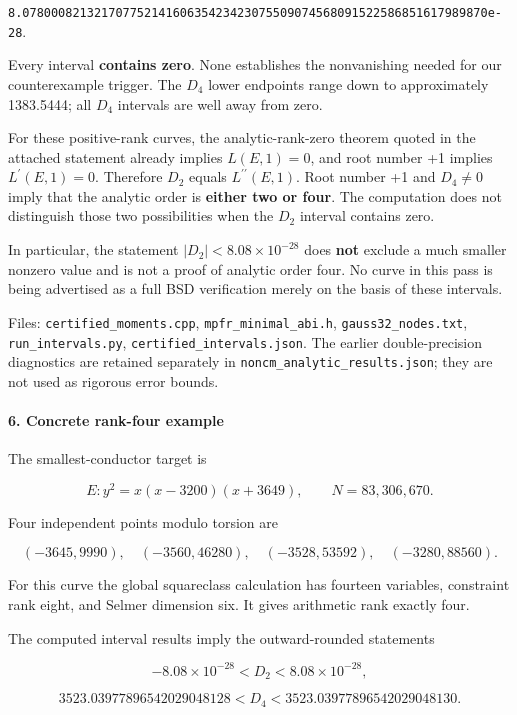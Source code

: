 \documentclass[11pt]{article}
\begin{document}
\nolinkurl{8.07800082132170775214160635423423075509074568091522586851617989870e-28}.

Every interval \textbf{contains zero}. None establishes the nonvanishing needed for our counterexample trigger. The \(D_4\) lower endpoints range down to approximately 1383.5444; all \(D_4\) intervals are well away from zero.

For these positive-rank curves, the analytic-rank-zero theorem quoted in the attached statement already implies \(L(E,1)=0\), and root number +1 implies \(L^{\prime}(E,1)=0\). Therefore \(D_2\) equals \(L^{\prime\prime}(E,1)\). Root number +1 and \(D_4\ne0\) imply that the analytic order is \textbf{either two or four}. The computation does not distinguish those two possibilities when the \(D_2\) interval contains zero.

In particular, the statement \(|D_2|<8.08\times10^{-28}\) does \textbf{not} exclude a much smaller nonzero value and is not a proof of analytic order four. No curve in this pass is being advertised as a full BSD verification merely on the basis of these intervals.

Files: \nolinkurl{certified_moments.cpp}, \nolinkurl{mpfr_minimal_abi.h}, \nolinkurl{gauss32_nodes.txt}, \nolinkurl{run_intervals.py}, \nolinkurl{certified_intervals.json}. The earlier double-precision diagnostics are retained separately in \nolinkurl{noncm_analytic_results.json}; they are not used as rigorous error bounds.

\paragraph{6. Concrete rank-four example}

The smallest-conductor target is

\[
E:y^2=x(x-3200)(x+3649),\qquad N=83,306,670.
\]

Four independent points modulo torsion are

\[
(-3645,9990),\quad(-3560,46280),\quad(-3528,53592),\quad(-3280,88560).
\]

For this curve the global squareclass calculation has fourteen variables, constraint rank eight, and Selmer dimension six. It gives arithmetic rank exactly four.

The computed interval results imply the outward-rounded statements

\[
-8.08\times10^{-28}<D_2<8.08\times10^{-28},
\]

\[
3523.03977896542029048128<D_4<3523.03977896542029048130.
\]
\end{document}
